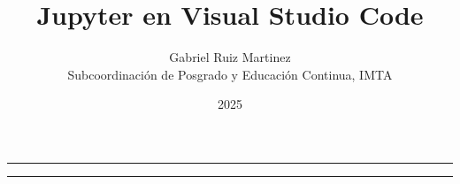 \documentclass{article}
\title{\textbf{Jupyter en Visual Studio Code}}
\date{2025}
\author{Gabriel Ruiz Martinez\\ Subcoordinación de Posgrado y Educación Continua, IMTA}
\begin{document}
\renewcommand{\contentsname}{Contenido} 

\maketitle
	
\vspace{0.25cm}
\hrule height 1pt

\tableofcontents
	
\vspace{0.25cm}
\hrule


\end{document}
